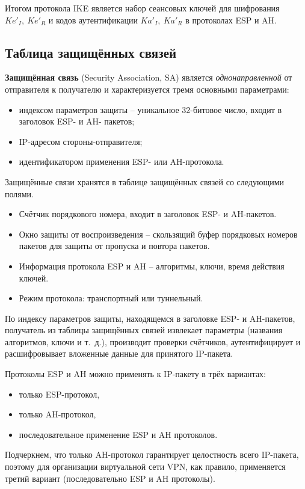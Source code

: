 Итогом протокола IKE является набор сеансовых ключей для шифрования $Ke'_I, ~ Ke'_R$ и кодов аутентификации $Ka'_I, ~ Ka'_R$ в протоколах ESP и AH.


\subsection{Таблица защищённых связей}

\textbf{Защищённая связь} (Security Association, SA) является \emph{однонаправленной} от отправителя к получателю и характеризуется тремя основными параметрами:
\begin{itemize}
    \item индексом параметров защиты -- уникальное 32-битовое число, входит в заголовок ESP- и AH- пакетов;
    \item IP-адресом стороны-отправителя;
    \item идентификатором применения ESP- или AH-протокола.
\end{itemize}

Защищённые связи хранятся в таблице защищённых связей со следующими полями.
\begin{itemize}
    \item Счётчик порядкового номера, входит в заголовок ESP- и AH-пакетов.
    \item Окно защиты от воспроизведения -- скользящий буфер порядковых номеров пакетов для защиты от пропуска и повтора пакетов.
    \item Информация протокола ESP и AH -- алгоритмы, ключи, время действия ключей.
    \item Режим протокола: транспортный или туннельный.
\end{itemize}

По индексу параметров защиты, находящемся в заголовке ESP- и AH-пакетов, получатель из таблицы защищённых связей извлекает параметры (названия алгоритмов, ключи и т.~д.), производит проверки счётчиков, аутентифицирует и расшифровывает вложенные данные для принятого IP-пакета.

Протоколы ESP и AH можно применять к IP-пакету в трёх вариантах:
\begin{itemize}
    \item только ESP-протокол,
     \item только AH-протокол,
    \item последовательное применение ESP и AH протоколов.
\end{itemize}
Подчеркнем, что только AH-протокол гарантирует целостность всего IP-пакета, поэтому для организации виртуальной сети VPN, как правило, применяется третий вариант (последовательно ESP и AH протоколы).


